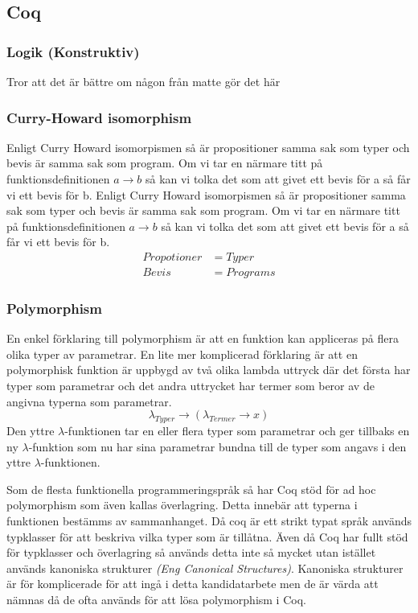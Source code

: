 \subsection{Coq}

\subsubsection{Logik (Konstruktiv)}
Tror att det är bättre om någon från matte gör det här

\subsubsection{Curry-Howard isomorphism}
Enligt Curry Howard isomorpismen så är propositioner samma sak som typer och
bevis är samma sak som program. Om vi tar en närmare titt på
funktionsdefinitionen $a \rightarrow b$ så kan vi tolka det som att givet ett
bevis för a så får vi ett bevis för b.
Enligt Curry Howard isomorpismen så är propositioner samma sak som typer och
bevis är samma sak som program. Om vi tar en närmare titt på
funktionsdefinitionen $a \rightarrow b$ så kan vi tolka det som att givet ett
bevis för a så får vi ett bevis för b.
\begin{align*}
Propotioner &= Typer \\
Bevis &= Programs
\end{align*}

\subsubsection{Polymorphism}
En enkel förklaring till polymorphism är att en funktion kan appliceras på
flera olika typer av parametrar.
En lite mer komplicerad förklaring är att en polymorphisk funktion är uppbygd av
två olika lambda uttryck där det första har typer som parametrar och det andra
uttrycket har termer som beror av de angivna typerna som parametrar.
\begin{equation}
  \lambda_{Typer} \rightarrow (\lambda_{Termer} \rightarrow x)
  \label{polymorphsk funktion}
\end{equation}
Den yttre $\lambda$-funktionen tar en eller flera typer som parametrar och ger
tillbaks en ny $\lambda$-funktion som nu har sina parametrar bundna till de
typer som angavs i den yttre $\lambda$-funktionen.

Som de flesta funktionella programmeringspråk så har Coq stöd för ad hoc
polymorphism som även kallas överlagring. Detta innebär att typerna i
funktionen bestämms av sammanhanget. Då coq är ett strikt typat språk används
typklasser för att beskriva vilka typer som är tillåtna.
Även då Coq har fullt stöd för typklasser och överlagring så används detta inte
så mycket utan istället används kanoniska strukturer {\it (Eng Canonical
Structures)}. Kanoniska strukturer är för komplicerade för att ingå i detta
kandidatarbete men de är värda att nämnas då de ofta används för att lösa
polymorphism i Coq.

